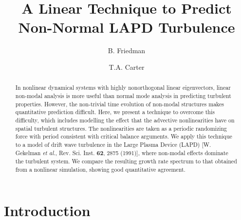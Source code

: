 \documentclass[showpacs,preprintnumbers,amsmath,amssymb,superscriptaddress,aip]{revtex4-1}
\begin{document}
\title{A Linear Technique to Predict Non-Normal LAPD Turbulence}

\author{B. Friedman}

\author{T.A. Carter}




\begin{abstract}
In nonlinear dynamical systems with highly nonorthogonal linear eigenvectors, linear non-modal analysis is more useful than normal mode analysis in predicting turbulent properties. 
However, the non-trivial time evolution of non-modal structures makes quantitative prediction difficult. Here, we present a technique to overcome this difficulty, which includes
modelling the effect that the advective nonlinearities have on spatial turbulent structures. The nonlinearities are taken as a periodic randomizing force with
period consistent with critical balance arguments. We apply this technique to a model of drift wave turbulence in the Large Plasma Device (LAPD) 
[W. Gekelman \emph{et al.}, Rev. Sci. Inst. {\bf 62}, 2875 (1991)], where non-modal effects dominate the turbulent system.
We compare the resulting growth rate spectrum to that obtained from a nonlinear simulation, showing good quantitative agreement.
\end{abstract}

\maketitle

\section{Introduction}
\end{document}
